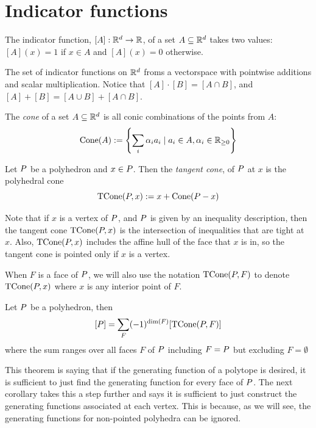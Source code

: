 \section{Indicator functions}

\begin{definition} 
The indicator function, $[A]: {\mathbb R}^d \rightarrow {\mathbb R}$, of a set $A \subseteq {\mathbb R}^d$ takes two values: $[A](x) =1$ if $x \in A$ and $[A](x)=0$ otherwise. 
\end{definition} 

The set of indicator functions on ${\mathbb R}^d$ froms a vectorspace with pointwise additions and scalar multiplication. Notice that $[A]\cdot [B] = [A \cap B]$, and $[A]+[B] = [A \cup B] + [A \cap B]$. 

\begin{definition} The \emph{cone} of a set $A \subseteq {\mathbb R}^d$ is all conic combinations of the points from $A$:
\[\operatorname{Cone}(A) := \left\{ \sum_i \alpha_i a_i \mid a_i \in A, \alpha_i \in {\mathbb R}_{\geq 0} \right\} \]
\end{definition} 

\begin{definition} 
Let ${ P}$ be a polyhedron and $x \in { P}$. Then the \emph{tangent cone}, of ${ P}$ at $x$ is the polyhedral cone 
\[\operatorname{TCone}({ P}, x) := x + \operatorname{Cone}({ P} - x)\]  
\end{definition} 
 
Note that if $x$ is a vertex of ${ P}$, and ${ P}$ is given by an inequality description, then the tangent cone $\operatorname{TCone}({ P}, x)$ is the intersection of inequalities that are tight at $x$. Also, $\operatorname{TCone}({ P}, x)$ includes the affine hull of the face that $x$ is in, so the tangent cone is pointed only if $x$ is a vertex. 

When $F$ is a face of ${ P}$, we will also use the notation $\operatorname{TCone}({ P}, F)$ to denote $\operatorname{TCone}({ P}, x)$ where $x$ is any interior point of $F$.

\begin{theorem}
Let ${ P}$ be a polyhedron, then 
\[[{ P}] = \sum_{F} (-1)^{\dim(F)}[\operatorname{TCone}({ P}, F)] \]
where the sum ranges over all faces $F$ of ${ P}$ including $F = { P}$ but excluding $F = \emptyset$
\end{theorem} 

This theorem is saying that if the generating function of a polytope is desired, it is sufficient to just find the generating function for every face of ${ P}$. The next
 corollary takes this a step further and says it is sufficient to just construct the generating functions associated at each vertex. This is because, as we will see, the generating functions for non-pointed polyhedra can be ignored.
 
